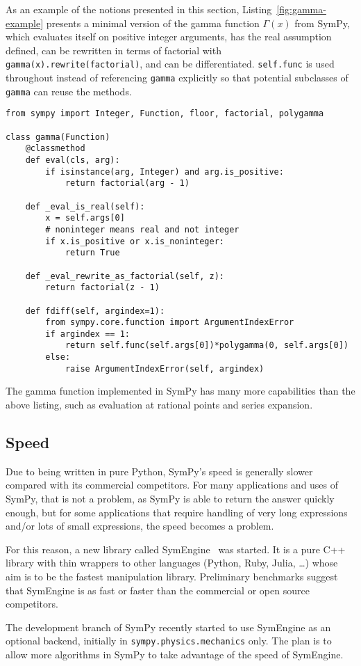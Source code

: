 As an example of the notions presented in this section,
Listing~\ref{fig:gamma-example} presents a minimal version of the gamma
function $\Gamma(x)$ from SymPy, which evaluates itself on positive integer
arguments, has the real assumption defined, can be rewritten in
terms of factorial with \verb|gamma(x).rewrite(factorial)|, and can be
differentiated. \texttt{self.func} is used throughout
instead of referencing \texttt{gamma} explicitly so that potential subclasses
of \texttt{gamma} can reuse the methods.

\lstset{
  basicstyle=\ttfamily,
}

\begin{lstlisting}[caption={A minimal implementation of \texttt{sympy.gamma}.},label=fig:gamma-example]
from sympy import Integer, Function, floor, factorial, polygamma

class gamma(Function)
    @classmethod
    def eval(cls, arg):
        if isinstance(arg, Integer) and arg.is_positive:
            return factorial(arg - 1)

    def _eval_is_real(self):
        x = self.args[0]
        # noninteger means real and not integer
        if x.is_positive or x.is_noninteger:
            return True

    def _eval_rewrite_as_factorial(self, z):
        return factorial(z - 1)

    def fdiff(self, argindex=1):
        from sympy.core.function import ArgumentIndexError
        if argindex == 1:
            return self.func(self.args[0])*polygamma(0, self.args[0])
        else:
            raise ArgumentIndexError(self, argindex)
\end{lstlisting}
The gamma function implemented in SymPy has many more capabilities than the
above listing, such as evaluation at rational points and series expansion.


\subsection{Speed}

Due to being written in pure Python, SymPy's speed is generally slower compared
with its commercial competitors. For many applications and uses of SymPy, that
is not a problem, as SymPy is able to return the answer quickly enough, but for
some applications that require handling of very long expressions and/or lots of
small expressions, the speed becomes a problem.

For this reason, a new library called SymEngine~\cite{SymEngine} was started.
It is a pure C++ library with thin wrappers to other languages (Python, Ruby,
Julia, \ldots) whose aim is to be the fastest manipulation library.  Preliminary
benchmarks suggest that SymEngine is as fast or faster than the commercial or
open source competitors.

The development branch of SymPy recently started to use SymEngine as an
optional backend, initially in \texttt{sympy.physics.mechanics} only. The plan is
to allow more algorithms in SymPy to take advantage of the speed of SymEngine.

